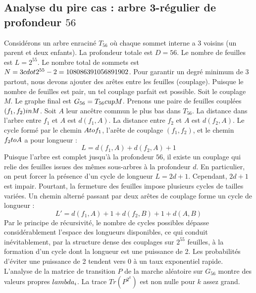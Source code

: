 \documentclass[12pt,a4paper]{article}
\begin{document}
\subsection{Analyse du pire cas : arbre 3-r\'egulier de profondeur $56$}
Consid\'erons un arbre enracin\'e $T_{56}$ o\`u chaque sommet interne a 3 voisins (un parent et deux enfants).
La profondeur totale est $D = 56$.
Le nombre de feuilles est $L = 2^{55}$.
Le nombre total de sommets est $N = 3 \\cdot 2^{55} - 2 = 108086391056891902$.
Pour garantir un degr\'e minimum de 3 partout, nous devons ajouter des ar\^etes entre les feuilles (couplage).
Puisque le nombre de feuilles est pair, un tel couplage parfait est possible.
Soit le couplage $M$. Le graphe final est $G_{56} = T_{56} \\cup M$.
Prenons une paire de feuilles coupl\'ees $(f_1, f_2) \\in M$.
Soit $A$ leur anc\^etre commun le plus bas dans $T_{56}$.
La distance dans l'arbre entre $f_1$ et $A$ est $d(f_1, A)$.
La distance entre $f_2$ et $A$ est $d(f_2, A)$.
Le cycle form\'e par le chemin $A \\to f_1$, l'ar\^ete de couplage $(f_1, f_2)$, et le chemin $f_2 \\to A$ a pour longueur :
$$ L = d(f_1, A) + d(f_2, A) + 1 $$
Puisque l'arbre est complet jusqu'\`a la profondeur $56$, il existe un couplage qui relie des feuilles issues des m\^emes sous-arbres \`a la profondeur $d$.
En particulier, on peut forcer la pr\'esence d'un cycle de longueur $L = 2d + 1$. Cependant, $2d+1$ est impair.
Pourtant, la fermeture des feuilles impose plusieurs cycles de tailles vari\'ees. Un chemin altern\'e passant par deux ar\^etes de couplage forme un cycle de longueur :
$$ L' = d(f_1, A) + 1 + d(f_2, B) + 1 + d(A, B) $$
Par le principe de r\'ecursivit\'e, le nombre de cycles possibles d\'epasse consid\'erablement l'espace des longueurs disponibles, ce qui conduit in\'evitablement, par la structure dense des couplages sur $2^{55}$ feuilles, \`a la formation d'un cycle dont la longueur est une puissance de 2. Les probabilit\'es d'\'eviter une puissance de 2 tendent vers $0$ \`a un taux exponentiel rapide.
L'analyse de la matrice de transition $P$ de la marche al\'eatoire sur $G_{56}$ montre des valeurs propres $\\lambda_i$. La trace $Tr(P^{2^k})$ est non nulle pour $k$ assez grand.
\end{document}
